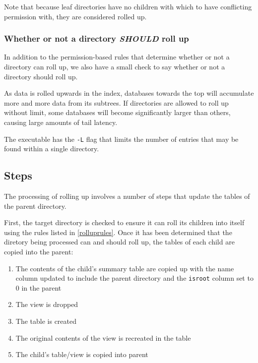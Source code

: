 Note that because leaf directories have no children with which to have
conflicting permission with, they are considered rolled up.

\subsubsection{Whether or not a directory {\it SHOULD} roll up}
In addition to the permission-based rules that determine whether or
not a directory can roll up, we also have a small check to say whether
or not a directory should roll up.

As data is rolled upwards in the index, databases towards the top will
accumulate more and more data from its subtrees. If directories are
allowed to roll up without limit, some databases will become
significantly larger than others, causing large amounts of tail
latency.

The \rollup executable has the \texttt{-L} flag that limits the number
of entries that may be found within a single directory.

\subsection{Steps}
The processing of rolling up involves a number of steps that update
the tables of the parent directory.

First, the target directory is checked to ensure it can roll its
children into itself using the rules listed in
\ref{rolluprules}. Once it has been determined that the diretory
being processed can and should roll up, the tables of each child are
copied into the parent:

\begin{enumerate}
\item The contents of the child's summary table are copied up with the
  name column updated to include the parent directory and the
  \texttt{isroot} column set to 0 in the parent
\item The \pentries view is dropped
\item The \pentries table is created
\item The original contents of the \pentries view is recreated in the
  \pentries table
\item The child's \pentries table/view is copied into parent
\end{enumerate}

